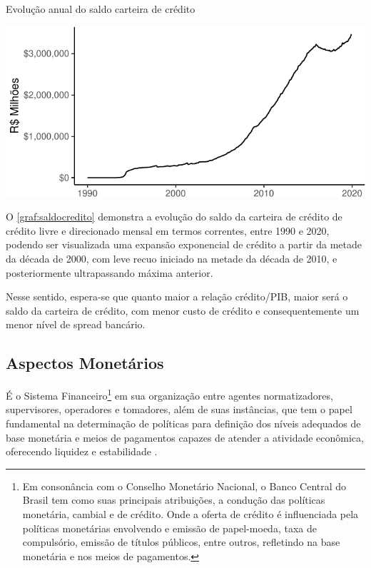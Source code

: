 \documentclass[
  12pt,
  12pt,
  openright,
  oneside,
  a4paper,
  chapter=TITLE,
  section=TITLE,
  subsection=TITLE,
  subsubsection=TITLE,
  portugues,
  sumario=tradicional]{abntex2}
\begin{document}
\begin{grafico}[!ht]
\vspace{20pt}
\caption{Evolução anual do saldo carteira de crédito}
\vspace{-4mm}

\begin{center}\includegraphics{12-exportedfigures/balance.credit-1} \end{center}
\vspace{-3mm}
\label{graf:saldocredito}
\vspace{-2mm}
\end{grafico}

O \autoref{graf:saldocredito} demonstra a evolução do saldo da carteira de crédito de crédito livre e direcionado mensal em termos correntes, entre 1990 e 2020, podendo ser visualizada uma expansão exponencial de crédito a partir da metade da década de 2000, com leve recuo iniciado na metade da década de 2010, e posteriormente ultrapassando máxima anterior.

Nesse sentido, espera-se que quanto maior a relação crédito/PIB, maior será o saldo da carteira de crédito, com menor custo de crédito e consequentemente um menor nível de spread bancário.

\subsection{Aspectos Monetários}

É o Sistema Financeiro\footnote{Em consonância com o Conselho Monetário Nacional, o Banco Central do Brasil tem como suas principais atribuições, a condução das políticas monetária, cambial e de crédito. Onde a oferta de crédito é influenciada pela políticas monetárias envolvendo e emissão de papel-moeda, taxa de compulsório, emissão de títulos públicos, entre outros, refletindo na base monetária e nos meios de pagamentos.} em sua organização entre agentes normatizadores, supervisores, operadores e tomadores, além de suas instâncias, que tem o papel fundamental na determinação de políticas para definição dos níveis adequados de base monetária e meios de pagamentos capazes de atender a atividade econômica, oferecendo liquidez e estabilidade .
\end{document}
